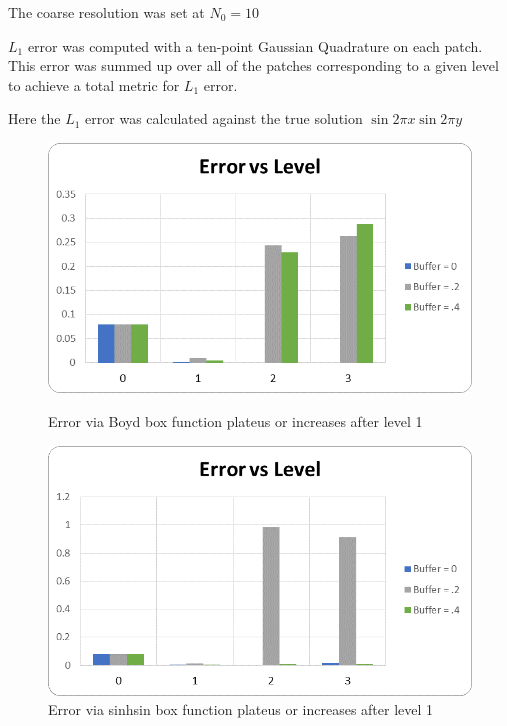 \documentclass[final]{siamart1116}
\numberwithin{theorem}{section}
\begin{document}
The coarse resolution was set at $N_0 = 10$

$L_1$ error was computed with a ten-point Gaussian Quadrature on each patch. This error was summed up over all of the patches corresponding to a given level to achieve a total metric for $L_1$ error.  



Here the $L_1$ error was calculated against the true solution $\sin{2\pi x}\sin{2 \pi y} $

\begin{figure}[h]
  \includegraphics[width=\linewidth]{convergencechebsinsin.png}
  \caption{Error via Boyd box function plateus or increases after level 1}
\endminipage\hfill
{}%
  \includegraphics[width=\linewidth]{convergencefouriersinsin.png}
  \caption{Error via sinhsin box function plateus or increases after level 1}
\endminipage
\end{figure}
\end{document}

